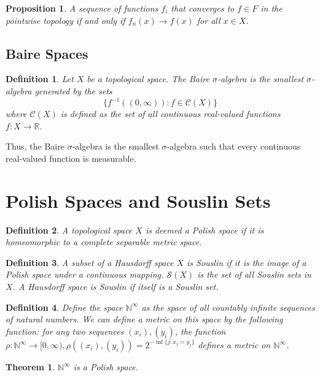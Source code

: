 \documentclass[12pt]{article}
\newtheorem{theorem}{Theorem}[section]
\newtheorem{definition}{Definition}[section]
\newtheorem{proposition}{Proposition}[section]
\theoremstyle{remark}
\begin{document}
\begin{proposition}
 A sequence of functions $f_i$ that converges to $f \in F$ in the pointwise topology if and only if $f_n(x) \rightarrow f(x)$ for all $x \in X$.
\end{proposition}


\subsection{Baire Spaces}

\begin{definition}
 Let $X$ be a topological space. The Baire $\sigma$-algebra is the smallest $\sigma$-algebra generated by the sets
 $$ \{ f^{-1}((0,\infty)) : f \in \mathcal{C}(X)\}$$ where $\mathcal{C}(X)$ is defined as the set of all continuous real-valued functions $f:X \rightarrow \mathbb{R}$.
\end{definition}

Thus, the Baire $\sigma$-algebra is the smallest $\sigma$-algebra such that every continuous real-valued function is measurable.

\section{Polish Spaces and Souslin Sets}

\begin{definition}
 A topological space $X$ is deemed a Polish space if it is homeomorphic to a complete separable metric space.
\end{definition}

\begin{definition}
 A subset of  a Hausdorff space $X$ is Souslin if it is the image of a Polish space under a continuous mapping. $\mathcal{S}(X)$ is the set of all Souslin sets in $X$. A Hausdorff space is Souslin if itself is a Souslin set.
\end{definition}

\begin{definition}
 Define the space $\mathbb{N}^{\infty}$ as the space of all countably infinite sequences of natural numbers. We can define a metric on this space by the following function: for any two sequences $(x_i),(y_i)$, the function $\rho: \mathbb{N}^{\infty} \rightarrow [0,\infty), \rho((x_i),(y_i)) = 2^{-\inf \{j : x_j = y_j\}}$ defines a metric on $\mathbb{N}^{\infty}$.
\end{definition}

\begin{theorem}
 $\mathbb{N}^{\infty}$ is a Polish space.
\end{theorem}
\end{document}
